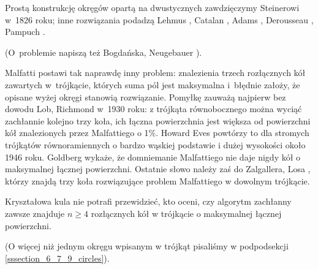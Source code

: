 Prostą konstrukcję okręgów opartą na dwustycznych zawdzięczymy Steinerowi \cite{steiner_1826} w~1826 roku;
%
inne rozwiązania podadzą Lehmus \cite{lehmus_1819}, Catalan \cite{catalan_1846}, Adams \cite{adams_1846}, Derousseau \cite{derousseau_1895}, Pampuch \cite{pampuch_1904}.

(O~problemie napiszą też Bogdańska, Neugebauer \cite[s. 102]{neugebauer_2018}).

Malfatti postawi tak naprawdę inny problem: znalezienia trzech rozłącznych kół zawartych w~trójkącie, których suma pól jest maksymalna i~błędnie założy, że opisane wyżej okręgi stanowią rozwiązanie.
Pomyłkę zauważą najpierw bez dowodu Lob, Richmond \cite{lob_richmond_1930} w~1930 roku: z trójkąta równobocznego można wyciąć zachłannie kolejno trzy koła, ich łączna powierzchnia jest większa od powierzchni kół znalezionych przez Malfattiego o 1\%.
%
%
Howard Eves powtórzy to dla stromych trójkątów równoramiennych o bardzo wąskiej podstawie i dużej wysokości około 1946 roku.
%
Goldberg \cite{goldberg_1967} wykaże, że domniemanie Malfattiego nie daje nigdy kół o maksymalnej łącznej powierzchni.
Ostatnie słowo należy zaś do Zalgallera, Losa \cite{zalgaller_los_1992}, którzy znajdą trzy koła rozwiązujące problem Malfattiego w dowolnym trójkącie.
%
%

Kryształowa kula nie potrafi przewidzieć, kto oceni, czy algorytm zachłanny zawsze znajduje $n \ge 4$ rozłącznych kół w trójkącie o maksymalnej łącznej powierzchni.

(O więcej niż jednym okręgu wpisanym w trójkąt pisaliśmy w podpodsekcji \ref{sssection_6_7_9_circles}).
